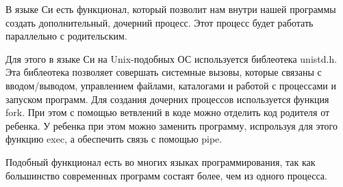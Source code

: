 \documentclass[pdf, unicode, 12pt, a4paper,oneside,fleqn]{article}
\begin{document}
В языке Си есть функционал, который позволит нам внутри нашей программы создать
дополнительный, дочерний процесс. Этот процесс будет работать параллельно с родительским.

Для этого в языке Си на Unix-подобных ОС используется библеотека unistd.h.
Эта библеотека позволяет совершать системные вызовы, которые связаны с 
вводом/выводом, управлением файлами, каталогами и работой с процессами и запуском программ.
Для создания дочерних процессов используется функция fork. При этом с помощью ветвлений 
в коде можно отделить код родителя от ребенка. У ребенка при этом можно заменить программу,
испрользуя для этого функцию exec, а обеспечить связь с помощью pipe.

Подобный функционал есть во многих языках программирования, так как большинство современных программ состаят более, чем из одного процесса.
\end{document}
